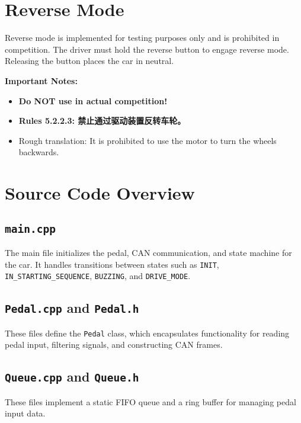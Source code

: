 \documentclass[a4paper,12pt]{article}
\begin{document}
\section{Reverse Mode}
Reverse mode is implemented for testing purposes only and is prohibited in competition. The driver must hold the reverse button to engage reverse mode. Releasing the button places the car in neutral.

\textbf{Important Notes:}
{
\begin{itemize}
    \item \textbf{Do NOT use in actual competition!}
    \item \textbf{Rules 5.2.2.3: 禁止通过驱动装置反转车轮。}
    \item Rough translation: It is prohibited to use the motor to turn the wheels backwards.
\end{itemize}
}

\section{Source Code Overview}
\subsection{\texttt{main.cpp}}
The main file initializes the pedal, CAN communication, and state machine for the car. It handles transitions between states such as \texttt{INIT}, \texttt{IN\_STARTING\_SEQUENCE}, \texttt{BUZZING}, and \texttt{DRIVE\_MODE}.



\subsection{\texttt{Pedal.cpp} and \texttt{Pedal.h}}
These files define the \texttt{Pedal} class, which encapsulates functionality for reading pedal input, filtering signals, and constructing CAN frames.





\subsection{\texttt{Queue.cpp} and \texttt{Queue.h}}
These files implement a static FIFO queue and a ring buffer for managing pedal input data.
\end{document}
